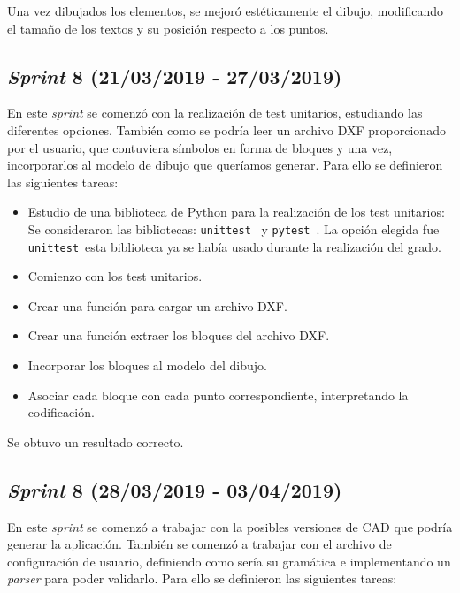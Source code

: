 Una vez dibujados los elementos, se mejoró estéticamente el dibujo, modificando el tamaño de los textos y su posición respecto a los puntos.

\subsection{\emph{Sprint} 8 (21/03/2019 - 27/03/2019)}

En este \emph{sprint} se comenzó con la realización de test unitarios, estudiando las diferentes opciones. También como se podría  leer un archivo DXF proporcionado por el usuario, que contuviera símbolos en forma de bloques y una vez, incorporarlos al modelo de dibujo que queríamos generar. Para ello se definieron las siguientes tareas:

\begin{itemize}
\item Estudio de una biblioteca de Python para la realización de los test unitarios: Se consideraron las bibliotecas: \texttt{unittest}~\cite{unittest} y \texttt{pytest}~\cite{pytest}. La opción elegida fue \texttt{unittest}\, esta biblioteca ya se había usado durante la realización del grado.

\item Comienzo con los test unitarios.

\item Crear una función para cargar un archivo DXF.

\item Crear una función extraer los bloques del archivo DXF.

\item Incorporar los bloques al modelo del dibujo.

\item Asociar cada bloque con cada punto correspondiente, interpretando la codificación.

\end{itemize}

Se obtuvo un resultado correcto.
 
\subsection{\emph{Sprint} 8 (28/03/2019 - 03/04/2019)}

En este \emph{sprint} se comenzó a trabajar con la posibles versiones de CAD que podría generar la aplicación. También se comenzó a trabajar con el archivo de configuración de usuario, definiendo como sería su gramática e implementando un \emph{parser} para poder validarlo. Para ello se definieron las siguientes tareas:

